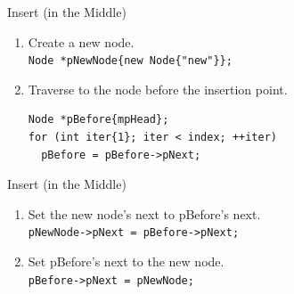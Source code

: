 \documentclass[14pt,aspectratio=1610, hyperref={pdfpagelayout=SinglePage}]{beamer}
\begin{document}
\begin{frame}[fragile, b]{Insert (in the Middle)}
\begin{enumerate}
\item
  Create a new node.\\
  \lstinline|Node *pNewNode{new Node{"new"}};|
\item<3->
  Traverse to the node before the insertion point.
    \begin{lstlisting}
Node *pBefore{mpHead};
for (int iter{1}; iter < index; ++iter)
  pBefore = pBefore->pNext;
\end{lstlisting}
\end{enumerate}\vspace{-1em}
%
\begin{center}
\end{center}
\end{frame}

\begin{frame}[fragile, b]{Insert (in the Middle)}
\begin{enumerate}\addtocounter{enumi}{2}
\item
  Set the new node's next to pBefore's next.\\
  \lstinline{pNewNode->pNext = pBefore->pNext;}\\%
\item<3->
  Set pBefore's next to the new node.\\
  \lstinline{pBefore->pNext = pNewNode;}\\%
\end{enumerate}
\begin{center}
\end{center}
\end{frame}
\end{document}
